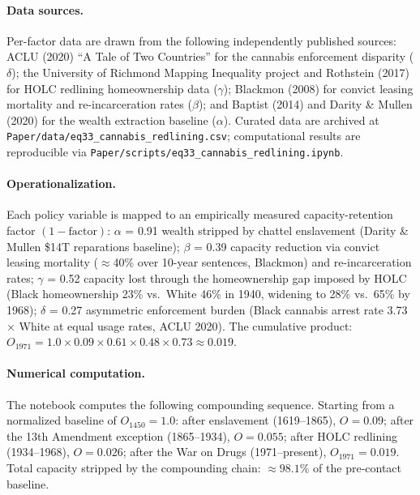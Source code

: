 \paragraph{Data sources.}
Per-factor data are drawn from the following independently published sources: ACLU (2020) ``A Tale of Two Countries'' \cite{aclu2020} for the cannabis enforcement disparity ($\delta$); the University of Richmond Mapping Inequality project \cite{mapping_inequality} and Rothstein (2017) \cite{rothstein} for HOLC redlining homeownership data ($\gamma$); Blackmon (2008) \cite{blackmon} for convict leasing mortality and re-incarceration rates ($\beta$); and Baptist (2014) \cite{baptist} and Darity \& Mullen (2020) \cite{darity_mullen} for the wealth extraction baseline ($\alpha$). Curated data are archived at \texttt{Paper/data/eq33\_cannabis\_redlining.csv}; computational results are reproducible via \texttt{Paper/scripts/eq33\_cannabis\_redlining.ipynb}.

\paragraph{Operationalization.}
Each policy variable is mapped to an empirically measured capacity-retention factor $(1 - \text{factor})$: $\alpha$ = 0.91 wealth stripped by chattel enslavement (Darity \& Mullen \$14T reparations baseline); $\beta$ = 0.39 capacity reduction via convict leasing mortality ($\approx$40\% over 10-year sentences, Blackmon) and re-incarceration rates; $\gamma$ = 0.52 capacity lost through the homeownership gap imposed by HOLC (Black homeownership 23\% vs.\ White 46\% in 1940, widening to 28\% vs.\ 65\% by 1968); $\delta$ = 0.27 asymmetric enforcement burden (Black cannabis arrest rate 3.73$\times$ White at equal usage rates, ACLU 2020). The cumulative product: $O_{1971} = 1.0 \times 0.09 \times 0.61 \times 0.48 \times 0.73 \approx 0.019$.

\paragraph{Numerical computation.}
The notebook computes the following compounding sequence. Starting from a normalized baseline of $O_{1450} = 1.0$: after enslavement (1619--1865), $O = 0.09$; after the 13th Amendment exception (1865--1934), $O = 0.055$; after HOLC redlining (1934--1968), $O = 0.026$; after the War on Drugs (1971--present), $O_{1971} = 0.019$. Total capacity stripped by the compounding chain: $\approx 98.1\%$ of the pre-contact baseline.

